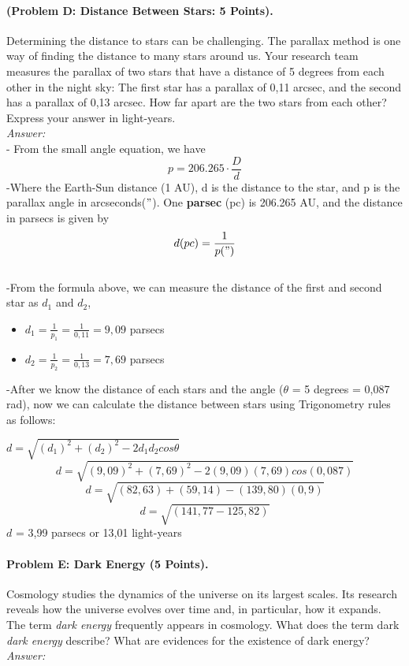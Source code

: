 \documentclass[12pt,times new roman, 2pt, a4paper]{report}
\begin{document}
\paragraph{(Problem D: Distance Between Stars: 5 Points).}
Determining the distance to stars can be challenging. The parallax method is one way of finding the distance to many stars around us. Your research team measures the parallax of two stars that have a distance of 5 degrees from each other in the night sky: The first star has a parallax of 0,11 arcsec, and the second has a parallax of 0,13 arcsec. How far apart are the two stars from each other? Express your answer in light-years.\\
\textit{Answer:}\\
- From the small angle equation, we have
$$ p = 206.265 \cdot \frac{D}{d}$$
-Where the Earth-Sun distance (1 AU), d is the distance to the star, and p is the parallax angle in arcseconds($"$). One \textbf{parsec} (pc) is 206.265 AU, and the distance in parsecs is given by
$$d (pc) = \frac{1}{p(")}$$\\
-From the formula above, we can measure the distance of the first and second star as ${d}_{1}$ and ${d}_{2}$,
\begin{itemize}
	\item ${d}_{1} = \frac{1}{{p}_{1}} = \frac{1}{0,11} = 9,09$ parsecs
	\item ${d}_{2} = \frac{1}{{p}_{2}} = \frac{1}{0,13} = 7,69$ parsecs
\end{itemize}
-After we know the distance of each stars and the angle ($\theta$ = 5 degrees = 0,087 rad), now we can calculate the distance between stars using Trigonometry rules as follows:
\begin{center}
$d=\sqrt{({d}_{1})^{2}+({d}_{2})^{2}-2{d}_{1}{d}_{2}cos\theta}$
$$d= \sqrt{(9,09)^{2}+(7,69)^{2}-2(9,09)(7,69)cos(0,087)}$$
$$d= \sqrt{(82,63)+(59,14)-(139,80)(0,9)}$$
$$d= \sqrt{(141,77-125,82)}$$
$d$ = 3,99 parsecs or 13,01 light-years\\
\end{center}


\paragraph{Problem E: Dark Energy (5 Points).}
Cosmology studies the dynamics of the universe on its largest scales. Its research reveals how the universe evolves over time and, in particular, how it expands. The term \textit{dark energy} frequently appears in cosmology. What does the term dark \textit{dark energy} describe? What are evidences for the existence of dark energy?\\
\textit{Answer:}
\end{document}
